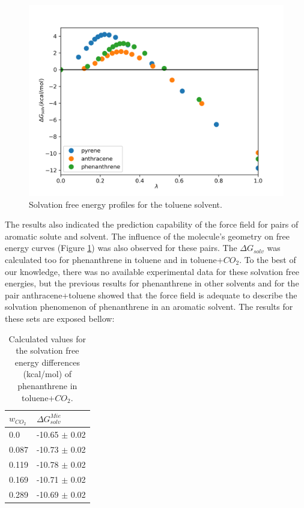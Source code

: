 \begin{figure}[H]
	\centering
    \includegraphics[width=0.9\linewidth]{Figures/tol}
    \caption{Solvation free energy profiles for the toluene solvent. }
    \label{fig:tol}
\end{figure}

 The results also indicated the prediction capability of the force field for pairs of aromatic solute and solvent. The influence of the molecule's geometry on free energy curves (Figure \ref{fig:tol}) was also observed for these pairs. The $\Delta G_{solv}$ was calculated too for phenanthrene in toluene and in toluene+$CO_{2}$. To the best of our knowledge, there was no available experimental data for these solvation free energies, but the previous results for phenanthrene in other solvents and for the pair anthracene+toluene showed that the force field is adequate to describe the solvation phenomenon of phenanthrene in an aromatic solvent. The results for these sets are exposed bellow: 
 
\FloatBarrier
\begin{table}[H]
\centering
  \caption{Calculated values for the solvation free energy differences (kcal/mol) of phenanthrene in toluene+$CO_{2}$.}
  \label{tbl:solv3}
  \begin{tabular}{ll}
    \hline
      $w_{CO_{2}}$ & $\Delta G_{solv}^{Mie}$ \\
    \hline
    0.0    & -10.65 $\pm$ 0.02   \\
    0.087  & -10.73 $\pm$ 0.02   \\
    0.119  & -10.78 $\pm$ 0.02   \\
    0.169  & -10.71 $\pm$ 0.02   \\
    0.289  & -10.69 $\pm$ 0.02   \\
    \hline
  \end{tabular}
\end{table}
\FloatBarrier

